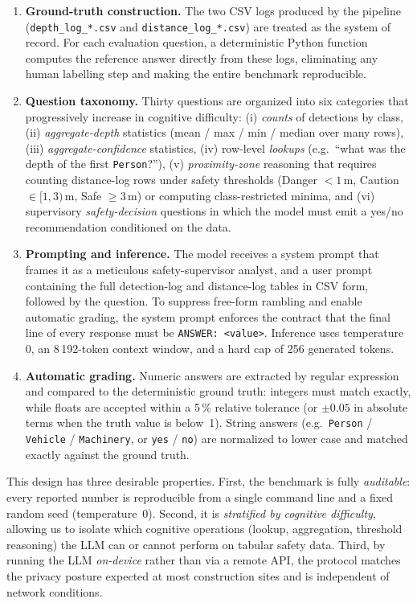 \documentclass{article}
\begin{document}
\begin{enumerate}
    \item \textbf{Ground-truth construction.} The two CSV logs produced by the pipeline (\texttt{depth\_log\_*.csv} and \texttt{distance\_log\_*.csv}) are treated as the system of record. For each evaluation question, a deterministic Python function computes the reference answer directly from these logs, eliminating any human labelling step and making the entire benchmark reproducible.
    \item \textbf{Question taxonomy.} Thirty questions are organized into six categories that progressively increase in cognitive difficulty: (i) \emph{counts} of detections by class, (ii) \emph{aggregate-depth} statistics (mean / max / min / median over many rows), (iii) \emph{aggregate-confidence} statistics, (iv) row-level \emph{lookups} (e.g.\ ``what was the depth of the first \texttt{Person}?''), (v) \emph{proximity-zone} reasoning that requires counting distance-log rows under safety thresholds (Danger $<1$\,m, Caution $\in[1,3)$\,m, Safe $\geq 3$\,m) or computing class-restricted minima, and (vi) supervisory \emph{safety-decision} questions in which the model must emit a yes/no recommendation conditioned on the data.
    \item \textbf{Prompting and inference.} The model receives a system prompt that frames it as a meticulous safety-supervisor analyst, and a user prompt containing the full detection-log and distance-log tables in CSV form, followed by the question. To suppress free-form rambling and enable automatic grading, the system prompt enforces the contract that the final line of every response must be \texttt{ANSWER: <value>}. Inference uses temperature~$0$, an 8\,192-token context window, and a hard cap of 256 generated tokens.
    \item \textbf{Automatic grading.} Numeric answers are extracted by regular expression and compared to the deterministic ground truth: integers must match exactly, while floats are accepted within a 5\,\% relative tolerance (or $\pm 0.05$ in absolute terms when the truth value is below~1). String answers (e.g.\ \texttt{Person} / \texttt{Vehicle} / \texttt{Machinery}, or \texttt{yes} / \texttt{no}) are normalized to lower case and matched exactly against the ground truth.
\end{enumerate}

This design has three desirable properties. First, the benchmark is fully \emph{auditable}: every reported number is reproducible from a single command line and a fixed random seed (temperature~$0$). Second, it is \emph{stratified by cognitive difficulty}, allowing us to isolate which cognitive operations (lookup, aggregation, threshold reasoning) the LLM can or cannot perform on tabular safety data. Third, by running the LLM \emph{on-device} rather than via a remote API, the protocol matches the privacy posture expected at most construction sites and is independent of network conditions.
\end{document}
